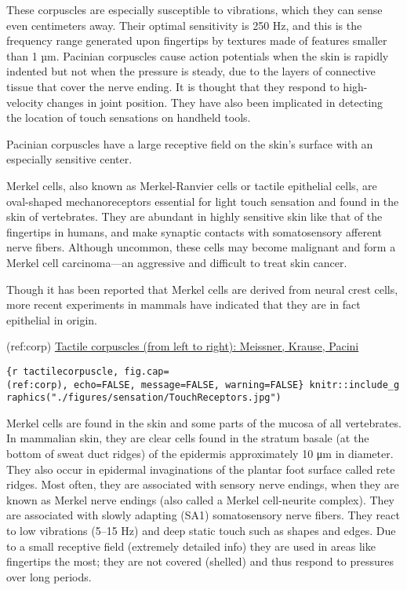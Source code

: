 These corpuscles are especially susceptible to vibrations, which they
can sense even centimeters away. Their optimal sensitivity is 250 Hz,
and this is the frequency range generated upon fingertips by textures
made of features smaller than 1 µm. Pacinian corpuscles cause action
potentials when the skin is rapidly indented but not when the pressure
is steady, due to the layers of connective tissue that cover the nerve
ending. It is thought that they respond to high-velocity changes in
joint position. They have also been implicated in detecting the location
of touch sensations on handheld tools.

Pacinian corpuscles have a large receptive field on the skin's surface
with an especially sensitive center.

Merkel cells, also known as Merkel-Ranvier cells or tactile epithelial
cells, are oval-shaped mechanoreceptors essential for light touch
sensation and found in the skin of vertebrates. They are abundant in
highly sensitive skin like that of the fingertips in humans, and make
synaptic contacts with somatosensory afferent nerve fibers. Although
uncommon, these cells may become malignant and form a Merkel cell
carcinoma---an aggressive and difficult to treat skin cancer.

Though it has been reported that Merkel cells are derived from neural
crest cells, more recent experiments in mammals have indicated that they
are in fact epithelial in origin.

(ref:corp)
\href{https://commons.wikimedia.org/wiki/File:Gray940.png}{Tactile
corpuscles (from left to right): Meissner, Krause, Pacini}

\texttt{\{r\ tactilecorpuscle,\ fig.cap=\textquotesingle{}(ref:corp)\textquotesingle{},\ echo=FALSE,\ message=FALSE,\ warning=FALSE\}\ knitr::include\_graphics("./figures/sensation/TouchReceptors.jpg")}

Merkel cells are found in the skin and some parts of the mucosa of all
vertebrates. In mammalian skin, they are clear cells found in the
stratum basale (at the bottom of sweat duct ridges) of the epidermis
approximately 10 μm in diameter. They also occur in epidermal
invaginations of the plantar foot surface called rete ridges. Most
often, they are associated with sensory nerve endings, when they are
known as Merkel nerve endings (also called a Merkel cell-neurite
complex). They are associated with slowly adapting (SA1) somatosensory
nerve fibers. They react to low vibrations (5--15 Hz) and deep static
touch such as shapes and edges. Due to a small receptive field
(extremely detailed info) they are used in areas like fingertips the
most; they are not covered (shelled) and thus respond to pressures over
long periods.

